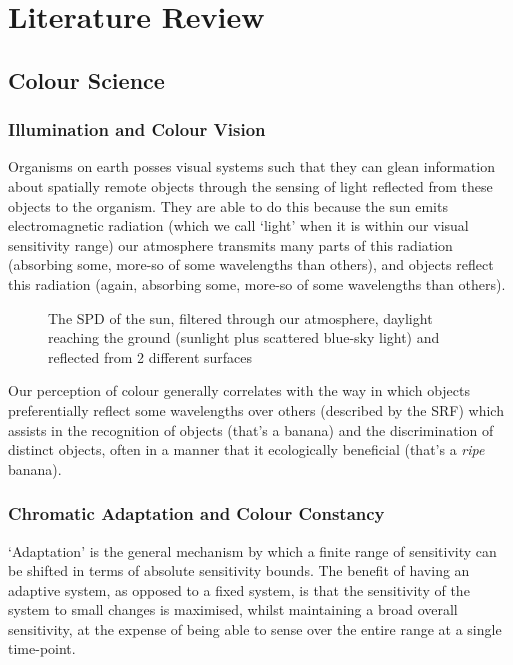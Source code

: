 \chapter{Literature Review}
\label{LitReview}

\section{Colour Science}

\subsection{Illumination and Colour Vision}

Organisms on earth posses visual systems such that they can glean information about spatially remote objects through the sensing of light reflected from these objects to the organism. They are able to do this because the sun emits electromagnetic radiation (which we call `light' when it is within our visual sensitivity range) our atmosphere transmits many parts of this radiation (absorbing some, more-so of some wavelengths than others), and objects reflect this radiation (again, absorbing some, more-so of some wavelengths than others).

\begin{figure}[htbp]
\caption{The \gls{SPD} of the sun, filtered through our atmosphere, daylight reaching the ground (sunlight plus scattered blue-sky light) and reflected from 2 different surfaces}
\label{fig:SPD}
\end{figure}

Our perception of colour generally correlates with the way in which objects preferentially reflect some wavelengths over others (described by the \acrfull{SRF}) which assists in the recognition of objects (that's a banana) and the discrimination of distinct objects, often in a manner that it ecologically beneficial (that's a \emph{ripe} banana).

\subsection{Chromatic Adaptation and Colour Constancy}
`Adaptation' is the general mechanism by which a finite range of sensitivity can be shifted in terms of absolute sensitivity bounds. The benefit of having an adaptive system, as opposed to a fixed system, is that the sensitivity of the system to small changes is maximised, whilst maintaining a broad overall sensitivity, at the expense of being able to sense over the entire range at a single time-point. 

